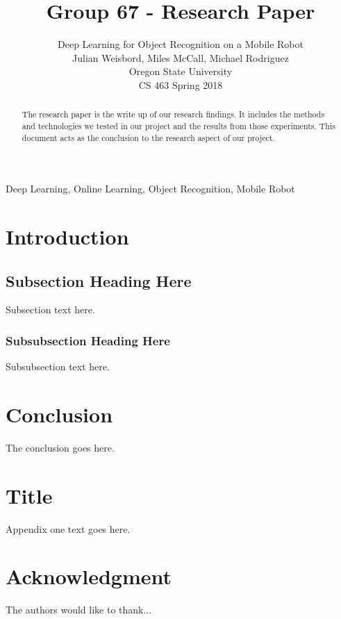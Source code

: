 \documentclass[journal]{IEEEtran}
\begin{document}
	\title{Group 67 - Research Paper}
	\author{Deep Learning for Object Recognition on a Mobile Robot\\
		Julian Weisbord, Miles McCall, Michael Rodriguez \\
		Oregon State University \\
		CS 463 Spring 2018 \\
	}
	
	\maketitle

\begin{abstract}
The research paper is the write up of our research findings. It includes the methods and technologies we tested in our project and the results from those experiments. This document acts as the conclusion to the research aspect of our project.  
\end{abstract}

\begin{IEEEkeywords}
Deep Learning, Online Learning, Object Recognition, Mobile Robot
\end{IEEEkeywords}

\section{Introduction}

	\subsection{Subsection Heading Here}
		Subsection text here.

\subsubsection{Subsubsection Heading Here}
Subsubsection text here.

\section{Conclusion}
The conclusion goes here.

\appendices
\section{Title}
Appendix one text goes here.

\section*{Acknowledgment}
The authors would like to thank...



\end{document}
